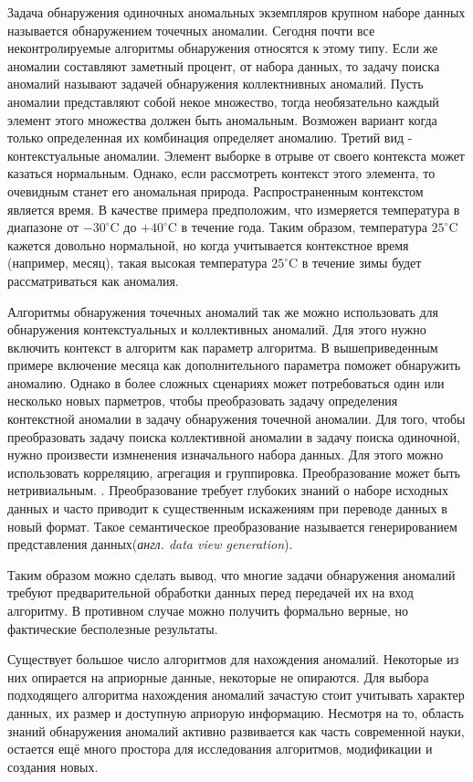 Задача обнаружения одиночных аномальных экземпляров  крупном наборе данных называется обнаружением точечных аномалии\cite{Book04}. Сегодня почти все  неконтролируемые алгоритмы обнаружения  относятся к этому типу. Если же аномалии составляют заметный процент, от набора данных, то задачу поиска аномалий называют задачей обнаружения коллектнивных аномалий. Пусть аномалии представляют собой некое множество, тогда необязательно каждый элемент этого множества должен быть аномальным. Возможен вариант когда только определенная их комбинация определяет аномалию.  Третий вид  -  контекстуальные аномалии. Элемент выборке в отрыве от своего контекста может казаться нормальным. Однако, если рассмотреть контекст этого элемента, то очевидным станет его аномальная природа.
 Распространенным контекстом является время. В качестве примера предположим, что  измеряется температура в диапазоне от $-30^{\circ}$C до $+40^{\circ}$C в течение года. Таким образом, температура $25^{\circ}$C кажется довольно нормальной, но когда  учитывается контекстное время (например, месяц), такая высокая температура $25^{\circ}$C  в течение зимы  будет рассматриваться как аномалия.

Алгоритмы обнаружения точечных аномалий так же можно использовать для обнаружения контекстуальных и коллективных аномалий. Для этого нужно включить контекст в алгоритм как параметр алгоритма. В вышеприведенным примере включение месяца как дополнительного параметра поможет обнаружить аномалию. Однако в более сложных сценариях может потребоваться один или несколько новых парметров, чтобы преобразовать задачу определения контекстной аномалии в задачу обнаружения точечной аномалии.  Для того, чтобы преобразовать задачу поиска коллективной аномалии в задачу поиска одиночной, нужно произвести измненения изначального набора данных. Для этого можно использовать корреляцию, агрегация и группировка. Преобразование  может быть нетривиальным.\cite{Book05} . 
Преобразование требует глубоких знаний о наборе исходных данных и часто приводит  к существенным искажениям при переводе данных в новый формат. Такое семантическое преобразование называется  генерированием представления данных(\textit{англ. data view generation}).
  
  Таким образом можно сделать вывод, что многие задачи обнаружения аномалий требуют предварительной обработки данных перед передачей их на вход алгоритму. В противном случае можно получить формально верные, но фактические бесполезные результаты.


Существует большое число алгоритмов для нахождения аномалий. Некоторые из них опирается на априорные данные, некоторые не опираются. Для выбора подходящего алгоритма нахождения аномалий зачастую стоит учитывать характер данных, их размер и доступную априорую информацию. Несмотря на то, область знаний обнаружения аномалий активно развивается как часть современной науки, остается ещё много простора для исследования алгоритмов, модификации и создания новых.

